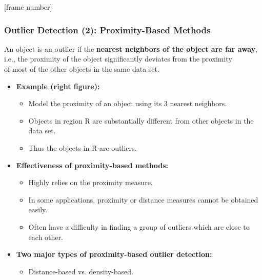 \documentclass[aspectratio=169,t,xcolor=dvipsnames]{beamer}
\begin{document}
{
[frame number]
\begin{frame}
	\frametitle{Outlier Detection (2): Proximity-Based Methods}

		An object is an outlier if the \textbf{\color{airforceblue}nearest neighbors of the object are far away},\\ i.e., the proximity of the object significantly deviates from the proximity\\ of most of the other objects in the same data set.
\begin{itemize}

	\item \textbf{Example (right figure):}
	\begin{itemize}
		\item Model the proximity of an object using its 3 nearest neighbors.
		\item Objects in region R are substantially different from other objects in the data set.
		\item Thus the objects in R are outliers.
	\end{itemize}
	\item \textbf{Effectiveness of proximity-based methods:}
	\begin{itemize}
		\item Highly relies on the proximity measure.
		\item In some applications, proximity or distance measures cannot be obtained easily.
		\item Often have a difficulty in finding a group of outliers which are close to each other.
	\end{itemize}
	\item \textbf{Two major types of proximity-based outlier detection:}
	\begin{itemize}
		\item Distance-based vs. density-based.
	\end{itemize}
\end{itemize}


\end{frame}}
\end{document}
